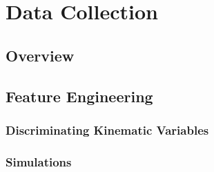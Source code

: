 \chapter{Data Collection}
\label{ch:data_collection}
\section{Overview}
\section{Feature Engineering}
\subsection{Discriminating Kinematic Variables}
\subsection{Simulations}
